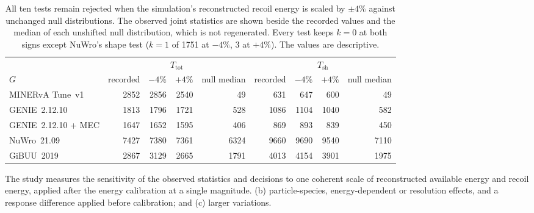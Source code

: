 \begin{table}[htbp]
  \caption[Descriptive recoil-scale sensitivity of the observed statistics]{All ten tests remain rejected when the simulation's reconstructed recoil energy is scaled by $\pm4\%$ against unchanged null distributions. The observed joint statistics are shown beside the recorded values and the median of each unshifted null distribution, which is not regenerated. Every test keeps $k=0$ at both signs except NuWro's shape test ($k=1$ of 1751 at $-4\%$, 3 at $+4\%$). The values are descriptive.}
  \label{tab:joint5d-recoil}
  \centering\small
  \begin{tabular}{@{}lrrrrrrrr@{}}
    \toprule
    & \multicolumn{4}{c}{$T_{\mathrm{tot}}$} & \multicolumn{4}{c}{$T_{\mathrm{sh}}$} \\
    \cmidrule(lr){2-5}\cmidrule(lr){6-9}
    $G$ & recorded & $-4\%$ & $+4\%$ & null median & recorded & $-4\%$ & $+4\%$ & null median \\
    \midrule
    MINERvA Tune~v1     & 2852 & 2856 & 2540 & 49   & 631  & 647  & 600  & 49 \\
    GENIE~2.12.10       & 1813 & 1796 & 1721 & 528  & 1086 & 1104 & 1040 & 582 \\
    GENIE~2.12.10 + MEC & 1647 & 1652 & 1595 & 406  & 869  & 893  & 839  & 450 \\
    NuWro~21.09         & 7427 & 7380 & 7361 & 6324 & 9660 & 9690 & 9540 & 7110 \\
    GiBUU~2019          & 2867 & 3129 & 2665 & 1791 & 4013 & 4154 & 3901 & 1975 \\
    \bottomrule
  \end{tabular}
\end{table}
The study measures the sensitivity of the observed statistics and decisions to one coherent scale of reconstructed available energy and recoil energy, applied after the energy calibration at a single magnitude. (b) particle-species, energy-dependent or resolution effects, and a response difference applied before calibration; and (c) larger variations.

